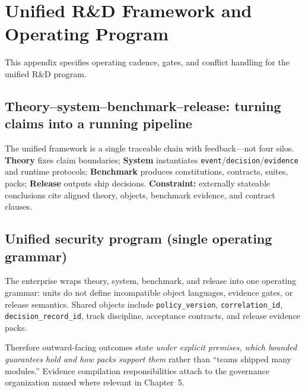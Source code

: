 \documentclass[11pt,a4paper]{report}
\begin{document}

\appendix

\chapter{Unified R\&D Framework and Operating Program}\label{app:rd-framework}
This appendix specifies operating cadence, gates, and conflict handling for the unified R\&D program.

\section{Theory--system--benchmark--release: turning claims into a running pipeline}
The unified framework is a single traceable chain with feedback---not four silos. \textbf{Theory} fixes claim boundaries; \textbf{System} instantiates \texttt{event}/\texttt{decision}/\texttt{evidence} and runtime protocols; \textbf{Benchmark} produces constitutions, contracts, suites, packs; \textbf{Release} outputs ship decisions. \textbf{Constraint:} externally stateable conclusions cite aligned theory, objects, benchmark evidence, and contract clauses.



\section{Unified security program (single operating grammar)}
The enterprise wraps theory, system, benchmark, and release into one operating grammar: units do not define incompatible object languages, evidence gates, or release semantics. Shared objects include \texttt{policy\_version}, \texttt{correlation\_id}, \texttt{decision\_record\_id}, track discipline, acceptance contracts, and release evidence packs.

Therefore outward-facing outcomes state \emph{under explicit premises, which bounded guarantees hold and how packs support them} rather than ``teams shipped many modules.'' Evidence compilation responsibilities attach to the governance organization named where relevant in Chapter~5.
\end{document}
